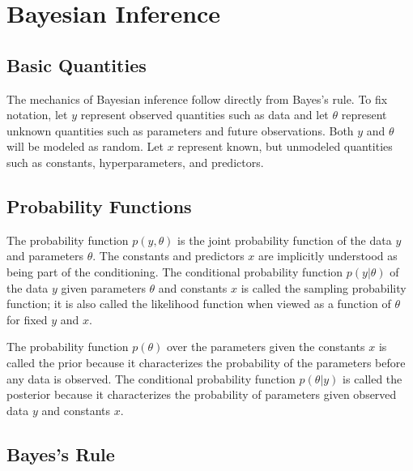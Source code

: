\section{Bayesian Inference}

\subsection{Basic Quantities}

The mechanics of Bayesian inference follow directly from Bayes's rule.
To fix notation, let $y$ represent observed quantities such as data
and let $\theta$ represent unknown quantities such as parameters and
future observations.  Both $y$ and $\theta$ will be modeled as random.
Let $x$ represent known, but unmodeled quantities such as constants,
hyperparameters, and predictors.

\subsection{Probability Functions}

The probability function $p(y,\theta)$ is the joint probability
function of the data $y$ and parameters $\theta$.  The constants and
predictors $x$ are implicitly understood as being part of the
conditioning.  The conditional probability function $p(y|\theta)$ of
the data $y$ given parameters $\theta$ and constants $x$ is called the
sampling probability function; it is also called the likelihood
function when viewed as a function of $\theta$ for fixed $y$ and $x$.

The probability function $p(\theta)$ over the parameters given the
constants $x$ is called the prior because it characterizes the probability
of the parameters before any data is observed.  The conditional
probability function $p(\theta|y)$ is called the posterior because
it characterizes the probability of parameters given observed data $y$
and constants $x$.

\subsection{Bayes's Rule}

